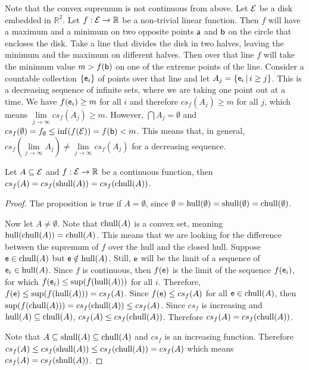 \begin{mathSection}

\begin{remark}
	Note that the convex supremum is not continuous from above. Let $\Ens$ be a disk embedded in $\mathbb{R}^2$. Let $f : \Ens \to \mathbb{R}$ be a non-trivial linear function. Then $f$ will have a maximum and a minimum on two opposite points $\ens[a]$ and $\ens[b]$ on the circle that encloses the disk. Take a line that divides the disk in two halves, leaving the minimum and the maximum on different halves. Then over that line $f$ will take the minimum value $m > f(\ens[b])$ on one of the extreme points of the line. Consider a countable collection $\{\ens_i\}$ of points over that line and let $A_j = \{ \ens_i \, | \, i \geq j \}$. This is a decreasing sequence of infinite sets, where we are taking one point out at a time.  We have $f(\ens_i) \geq m$ for all $i$ and therefore $cs_f(A_j) \geq m$ for all $j$, which means $\lim\limits_{j \to \infty} cs_f(A_j) \geq m$. However, $\bigcap A_j = \emptyset$ and $cs_f(\emptyset) = f_{\emptyset} \leq \inf(f(\Ens)) = f(\ens[b]) < m$. This means that, in general, $cs_f(\lim\limits_{j \to \infty} A_j) \neq \lim\limits_{j \to \infty} cs_f(A_j)$ for a decreasing sequence.
\end{remark}

\begin{prop}\label{pm-es-convexSupremumContinuous}
	Let $A \subseteq \Ens$ and $f: \Ens \to \mathbb{R}$ be a continuous function, then $cs_f(A) = cs_f(\shull(A)) = cs_f(\chull(A))$.
\end{prop}

\begin{proof}
	The proposition is true if $A = \emptyset$, since $\emptyset = \hull(\emptyset) = \shull(\emptyset) = \chull(\emptyset)$.
	
	Now let $A \neq \emptyset$. Note that $\chull(A)$ is a convex set, meaning $\hull(\chull(A)) = \chull(A)$. This means that we are looking for the difference between the supremum of $f$ over the hull and the closed hull. Suppose $\ens \in \chull(A)$ but $\ens \notin \hull(A)$. Still, $\ens$ will be the limit of a sequence of $\ens_i \in \hull(A)$. Since $f$ is continuous, then $f(\ens)$ is the limit of the sequence $f(\ens_i)$, for which $f(\ens_i) \leq \sup(f(\hull(A)))$ for all $i$. Therefore, $f(\ens) \leq \sup(f(\hull(A))) = cs_f(A)$. Since $f(\ens) \leq cs_f(A)$ for all $\ens \in \chull(A)$, then $\sup(f(\chull(A))) = cs_f(\chull(A)) \leq cs_f(A)$. Since $cs_f$ is increasing and $\hull(A) \subseteq \chull(A)$, $cs_f(A) \leq cs_f(\chull(A))$. Therefore $cs_f(A) = cs_f(\chull(A))$.
	
	Note that $A \subseteq \shull(A) \subseteq \chull(A)$ and $cs_f$ is an increasing function. Therefore $cs_f(A) \leq cs_f(\shull(A)) \leq cs_f(\chull(A)) = cs_f(A)$ which means $cs_f(A) = cs_f(\shull(A))$.
\end{proof}

\end{mathSection}

